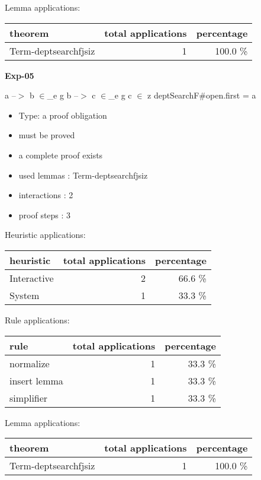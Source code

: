 \documentclass[a4paper]{article}
\begin{document}
Lemma applications:

\begin{supertabular}{l|r|r}
theorem	        & total applications & percentage \\ \hline
Term-deptsearchfjsiz & 1 & 100.0 \% \\

\end{supertabular}
\pagebreak

{\LARGE\bf Exp-05}\label{lemma-Exp-05}

\medskip

 \Fol a --$>$ b $\in$\_e g \And b --$>$ c $\in$\_e g \And c $\in$ z \Imp \Do deptSearchF\#\Dc open.first = a

\begin{itemize}

\item Type: a proof obligation

\item       must be proved
\item       a complete proof exists
\item       used lemmas  : Term-deptsearchfjsiz
\item       interactions : 2
\item       proof steps  : 3
\end{itemize}

\medskip


Heuristic applications:

\begin{supertabular}{l|r|r}
heuristic	& total applications & percentage \\ \hline
Interactive & 2 & 66.6 \% \\
System & 1 & 33.3 \% \\

\end{supertabular}

Rule applications:

\begin{supertabular}{l|r|r}
rule	        & total applications & percentage \\ \hline
normalize & 1 & 33.3 \% \\
insert lemma & 1 & 33.3 \% \\
simplifier & 1 & 33.3 \% \\

\end{supertabular}

Lemma applications:

\begin{supertabular}{l|r|r}
theorem	        & total applications & percentage \\ \hline
Term-deptsearchfjsiz & 1 & 100.0 \% \\

\end{supertabular}
\pagebreak
\end{document}
